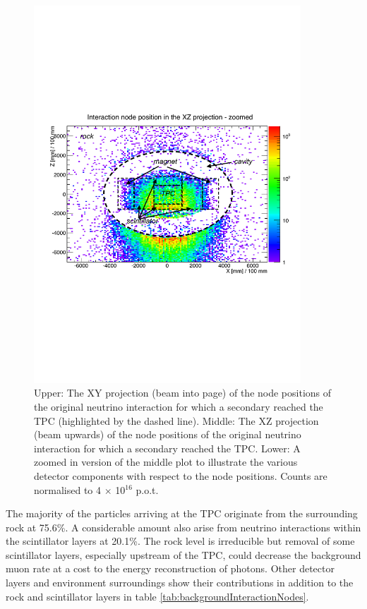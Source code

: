 \begin{figure}
\begin{center}
  	\includegraphics[width=100mm]{Chapter4/figures/rockPositionOrigin_XZ_zoom_copy1.pdf}
	\caption{Upper: The XY projection (beam into page) of the node positions of the original neutrino interaction for which a secondary reached the TPC (highlighted by the dashed line). Middle: The XZ projection (beam upwards) of the node positions of the original neutrino interaction for which a secondary reached the TPC. Lower: A zoomed in version of the middle plot to illustrate the various detector components with respect to the node positions. Counts are normalised to 4 $\times$ 10$^{16}$ p.o.t.}
	\label{fig:rockInteractionsOrigin}
\end{center}
\end{figure}

The majority of the particles arriving at the TPC originate from the surrounding rock at 75.6\%. A considerable amount also arise from neutrino interactions within the scintillator layers at 20.1\%. The rock level is irreducible but removal of some scintillator layers, especially upstream of the TPC, could decrease the background muon rate at a cost to the energy reconstruction of photons. Other detector layers and environment surroundings show their contributions in addition to the rock and scintillator layers in table \ref{tab:backgroundInteractionNodes}.


